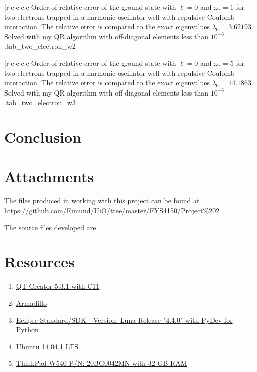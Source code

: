 \documentclass[11pt,english,a4paper]{article}
\begin{document}
\begin{flushleft}
\begin{tabell}{|r|c|c|c|c|}{\small}{}{}{Order of relative error of the ground state with $\ell = 0$ and $\omega_r = 1$ for two electrons trapped in a harmonic oscillator well with repulsive Coulomb interaction. The relative error is compared to the exact eigenvalues  $\lambda_0 = 3.62193$. Solved with my QR algorithm with off-diagonal elements less than $10^{-6}$.}{tab_two_electron_w2}
\end{tabell}

\begin{tabell}{|r|c|c|c|c|}{\small}{}{}{Order of relative error of the ground state with $\ell = 0$ and $\omega_r = 5$ for two electrons trapped in a harmonic oscillator well with repulsive Coulomb interaction. The relative error is compared to the exact eigenvalues  $\lambda_0 = 14.1863$. Solved with my QR algorithm with off-diagonal elements less than $10^{-6}$.}{tab_two_electron_w3}
\end{tabell}

\newpage

\section{Conclusion}

\section{Attachments}

The files produced in working with this project can be found at \href{https://github.com/Eimund/UiO/tree/master/FYS4150/Project\%202}{https://github.com/Eimund/UiO/tree/master/FYS4150/Project\%202} \linebreak

The source files developed are

\section{Resources}

\begin{enumerate}
\item{\href{http://qt-project.org/downloads}{QT Creator 5.3.1 with C11}}
\item{\href{http://arma.sourceforge.net/}{Armadillo}}
\item{\href{https://www.eclipse.org/downloads/}{Eclipse Standard/SDK  - Version: Luna Release (4.4.0) with PyDev for Python}}
\item{\href{http://www.ubuntu.com/download/desktop}{Ubuntu 14.04.1 LTS}}
\item{\href{http://shop.lenovo.com/no/en/laptops/thinkpad/w-series/w540/#tab-reseller}{ThinkPad W540 P/N: 20BG0042MN with 32 GB RAM}}
\end{enumerate}


\end{flushleft}
\end{document}
